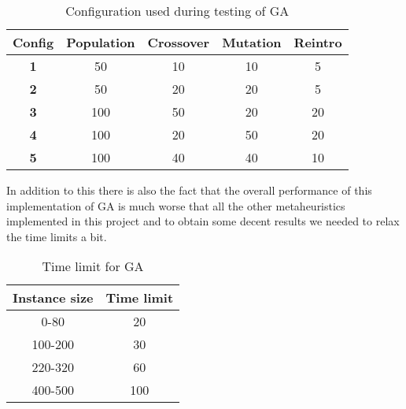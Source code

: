 \begin{table}[H]
	\centering
	\begin{tabular}{|c|c|c|c|c|}
        \hline \textbf{Config} & \textbf{Population} & \textbf{Crossover} & \textbf{Mutation} & \textbf{Reintro} \\
		\hline \textbf{1} & 50 & 10 & 10 & 5 \\
		\hline \textbf{2} & 50 & 20 & 20 & 5 \\
        \hline \textbf{3} & 100 & 50 & 20 & 20 \\
        \hline \textbf{4} & 100 & 20 & 50 & 20 \\
        \hline \textbf{5} & 100 & 40 & 40 & 10 \\
        \hline
	\end{tabular}
    \vspace{2mm}    
	\caption{Configuration used during testing of GA} \label{tab:geneticConf}
\end{table}

In addition to this there is also the fact that the overall performance of this implementation of GA is much worse that all the other metaheuristics implemented in this project and to obtain some decent results we needed to relax the time limits a bit.

\begin{table}[htbp]
	\centering
	\begin{tabular}{|c|c|}
        \hline \textbf{Instance size} & \textbf{Time limit} \\
		\hline 0-80 & 20 \\
		\hline 100-200 & 30 \\
        \hline 220-320 & 60 \\
        \hline 400-500 & 100 \\
        \hline
	\end{tabular}
    \vspace{2mm}    
	\caption{Time limit for GA} \label{tab:geneticTlim}
\end{table}


